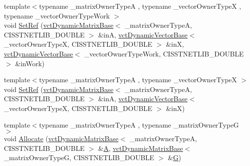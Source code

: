 \begin{DoxyCompactItemize}
\item 
{\footnotesize template$<$typename \-\_\-matrix\-Owner\-Type\-A , typename \-\_\-vector\-Owner\-Type\-X , typename \-\_\-vector\-Owner\-Type\-Work $>$ }\\void \hyperlink{classnmr_l_sq_lin_solution_dynamic_a7f70165a2f3b0f44ddb6e7bbca7a755c}{Set\-Ref} (\hyperlink{classvct_dynamic_matrix_base}{vct\-Dynamic\-Matrix\-Base}$<$ \-\_\-matrix\-Owner\-Type\-A, C\-I\-S\-S\-T\-N\-E\-T\-L\-I\-B\-\_\-\-D\-O\-U\-B\-L\-E $>$ \&in\-A, \hyperlink{classvct_dynamic_vector_base}{vct\-Dynamic\-Vector\-Base}$<$ \-\_\-vector\-Owner\-Type\-X, C\-I\-S\-S\-T\-N\-E\-T\-L\-I\-B\-\_\-\-D\-O\-U\-B\-L\-E $>$ \&in\-X, \hyperlink{classvct_dynamic_vector_base}{vct\-Dynamic\-Vector\-Base}$<$ \-\_\-vector\-Owner\-Type\-Work, C\-I\-S\-S\-T\-N\-E\-T\-L\-I\-B\-\_\-\-D\-O\-U\-B\-L\-E $>$ \&in\-Work)
\item 
{\footnotesize template$<$typename \-\_\-matrix\-Owner\-Type\-A , typename \-\_\-vector\-Owner\-Type\-X $>$ }\\void \hyperlink{classnmr_l_sq_lin_solution_dynamic_aa739cae11ba1d819d9a1f16d86f3d6ca}{Set\-Ref} (\hyperlink{classvct_dynamic_matrix_base}{vct\-Dynamic\-Matrix\-Base}$<$ \-\_\-matrix\-Owner\-Type\-A, C\-I\-S\-S\-T\-N\-E\-T\-L\-I\-B\-\_\-\-D\-O\-U\-B\-L\-E $>$ \&in\-A, \hyperlink{classvct_dynamic_vector_base}{vct\-Dynamic\-Vector\-Base}$<$ \-\_\-vector\-Owner\-Type\-X, C\-I\-S\-S\-T\-N\-E\-T\-L\-I\-B\-\_\-\-D\-O\-U\-B\-L\-E $>$ \&in\-X)
\item 
{\footnotesize template$<$typename \-\_\-matrix\-Owner\-Type\-A , typename \-\_\-matrix\-Owner\-Type\-G $>$ }\\void \hyperlink{classnmr_l_sq_lin_solution_dynamic_a98285ee643a5ab53cc31847592e85a0c}{Allocate} (\hyperlink{classvct_dynamic_matrix_base}{vct\-Dynamic\-Matrix\-Base}$<$ \-\_\-matrix\-Owner\-Type\-A, C\-I\-S\-S\-T\-N\-E\-T\-L\-I\-B\-\_\-\-D\-O\-U\-B\-L\-E $>$ \&\hyperlink{classnmr_l_sq_lin_solution_dynamic_aa4a41abac141e2e55dd5cafb59169dfd}{A}, \hyperlink{classvct_dynamic_matrix_base}{vct\-Dynamic\-Matrix\-Base}$<$ \-\_\-matrix\-Owner\-Type\-G, C\-I\-S\-S\-T\-N\-E\-T\-L\-I\-B\-\_\-\-D\-O\-U\-B\-L\-E $>$ \&\hyperlink{classnmr_l_sq_lin_solution_dynamic_a399cb314fb848d36f58c14830bad0c28}{G})
\item 

\end{DoxyCompactItemize}

